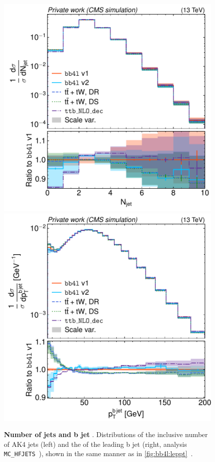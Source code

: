 \begin{figure}[tp]
    \centering
    \includegraphics[width=0.49 \textwidth]{figures/bb4l/generators/MC_TTBAR_DILEP_SPINDENSITY_njet.pdf}
    \hfill
    \includegraphics[width=0.49 \textwidth]{figures/bb4l/generators/MC_HFJETS_ptBJetLead.pdf}
    \caption{\textbf{Number of jets and b jet \pt}. Distributions of the inclusive number of AK4 jets (left) and the \pt of the leading b jet (right, \rivet analysis \texttt{MC\_HFJETS}~\cite{Rivet:2019rhm}), shown in the same manner as in \cref{fig:bb4l:leppt}~\cite{CMS:NOTE-2023-015}.}
    \label{fig:bb4l:jets1}
\end{figure}

